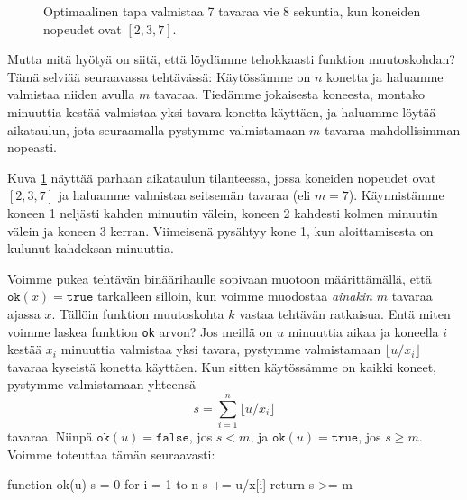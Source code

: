 \begin{figure}
\center
{}
\caption{Optimaalinen tapa valmistaa 7 tavaraa vie 8 sekuntia,
kun koneiden nopeudet ovat $[2,3,7]$.}
\label{fig:optkon}
\end{figure}

Mutta mitä hyötyä on siitä, että löydämme tehokkaasti funktion muutoskohdan?
Tämä selviää seuraavassa tehtävässä:
Käytössämme on $n$ konetta
ja haluamme valmistaa niiden avulla $m$ tavaraa.
Tiedämme jokaisesta koneesta,
montako minuuttia kestää valmistaa yksi tavara konetta käyttäen,
ja haluamme löytää aikataulun, jota seuraamalla pystymme valmistamaan
$m$ tavaraa mahdollisimman nopeasti.

Kuva \ref{fig:optkon} näyttää parhaan aikataulun tilanteessa,
jossa koneiden nopeudet ovat $[2,3,7]$ ja haluamme
valmistaa seitsemän tavaraa (eli $m=7$).
Käynnistämme koneen 1 neljästi kahden minuutin välein,
koneen 2 kahdesti kolmen minuutin välein ja koneen 3 kerran.
Viimeisenä pysähtyy kone 1, kun aloittamisesta
on kulunut kahdeksan minuuttia.

Voimme pukea tehtävän binäärihaulle sopivaan muotoon määrittämällä,
että $\texttt{ok}(x)=\texttt{true}$ tarkalleen silloin, kun voimme muodostaa
\emph{ainakin} $m$ tavaraa ajassa $x$.
Tällöin funktion muutoskohta $k$ vastaa tehtävän ratkaisua.
Entä miten voimme laskea funktion \texttt{ok} arvon?
Jos meillä on $u$ minuuttia aikaa ja koneella $i$ kestää $x_i$
minuuttia valmistaa yksi tavara, pystymme valmistamaan
$\lfloor u/x_i \rfloor$ tavaraa kyseistä konetta käyttäen.
Kun sitten käytössämme on kaikki koneet,
pystymme valmistamaan yhteensä
\[ s = \sum_{i=1}^n \lfloor u/x_i \rfloor \]
tavaraa. Niinpä $\texttt{ok}(u)=\texttt{false}$, jos $s<m$,
ja $\texttt{ok}(u)=\texttt{true}$, jos $s \ge m$. Voimme toteuttaa tämän seuraavasti:

\begin{code}
function ok(u)
    s = 0
    for i = 1 to n
        s += u/x[i]
    return s >= m
\end{code}

